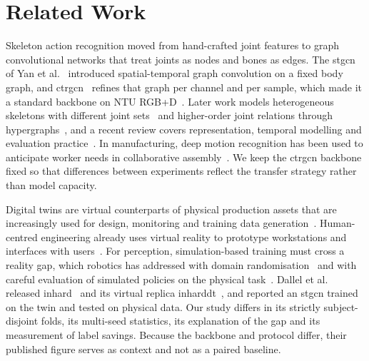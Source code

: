 \documentclass[Afour,sagev,times]{sagej}
\begin{document}
\section{Related Work}
\label{sec:related}

Skeleton action recognition moved from hand-crafted joint features to graph
convolutional networks that treat joints as nodes and bones as edges. The
\ac{stgcn} of Yan et al.~\cite{yan2018stgcn} introduced spatial-temporal graph
convolution on a fixed body graph, and \ac{ctrgcn}~\cite{chen2021ctrgcn}
refines that graph per channel and per sample, which made it a standard
backbone on NTU RGB+D~\cite{shahroudy2016ntu,liu2020ntu120}. Later work models
heterogeneous skeletons with different joint sets~\cite{wang2025heterogeneous}
and higher-order joint relations through hypergraphs~\cite{chen2025hypergraph},
and a recent review covers representation, temporal modelling and evaluation
practice~\cite{liu2025skeletonreview}. In manufacturing, deep motion
recognition has been used to anticipate worker needs in collaborative
assembly~\cite{wang2018hrcmotion}. We keep the \ac{ctrgcn} backbone fixed so
that differences between experiments reflect the transfer strategy rather than
model capacity.

Digital twins are virtual counterparts of physical production assets that are
increasingly used for design, monitoring and training data
generation~\cite{tao2019digitaltwin}. Human-centred engineering already uses
virtual reality to prototype workstations and interfaces with
users~\cite{valentini2025digital}. For perception, simulation-based training
must cross a reality gap, which robotics has addressed with domain
randomisation~\cite{tobin2017domainrandomization} and with careful evaluation
of simulated policies on the physical task~\cite{rothert2024simtoreal}. Dallel
et al. released \ac{inhard}~\cite{dallel2020inhardpaper,dallel2020inhard} and
its virtual replica \ac{inharddt}~\cite{dallel2023digital,dallel2023dataset},
and reported an \ac{stgcn} trained on the twin and tested on physical data.
Our study differs in its strictly subject-disjoint folds, its multi-seed
statistics, its explanation of the gap and its measurement of label savings.
Because the backbone and protocol differ, their published figure serves as
context and not as a paired baseline.
\end{document}

